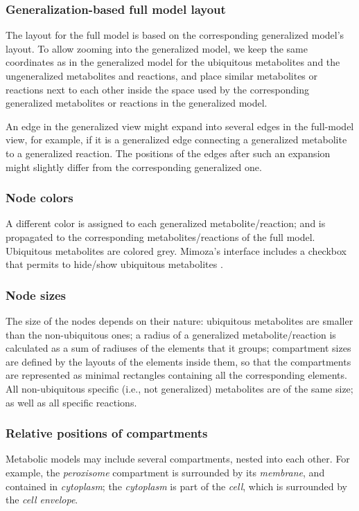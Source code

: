 \documentclass{bmcart}
\begin{document}
\subsubsection*{Generalization-based full model layout}
The layout for the full model is based on the corresponding generalized model's layout. To allow zooming into the generalized model, we keep the same coordinates as in the generalized model for the ubiquitous metabolites and the ungeneralized metabolites and reactions, and place similar metabolites or reactions next to each other inside the space used by the corresponding generalized metabolites or reactions in the generalized model. 

An edge in the generalized view might expand into several edges in the full-model view, for example, if it is a generalized edge connecting a generalized metabolite to a generalized reaction. The positions of the edges after such an expansion might slightly differ from the corresponding generalized one.

\subsubsection*{Node colors}

A different color is assigned to each generalized metabolite/reaction; and is propagated to the corresponding metabolites/reactions of the full model. Ubiquitous metabolites are colored grey. Mimoza's interface includes a checkbox that permits to hide/show ubiquitous metabolites .

\subsubsection*{Node sizes}

The size of the nodes depends on their nature: ubiquitous metabolites are smaller than the non-ubiquitous ones; a radius of a generalized metabolite/reaction is calculated as a sum of radiuses of the elements that it groups; compartment sizes are defined by the layouts of the elements inside them, so that the compartments are represented as minimal rectangles containing all the corresponding elements. All non-ubiquitous specific (i.e., not generalized) metabolites are of the same size; as well as all specific reactions.

\subsubsection*{Relative positions of compartments}
Metabolic models may include several compartments, nested into each other. For example, the \emph{peroxisome} compartment is surrounded by its \emph{membrane}, and contained in \emph{cytoplasm}; the \emph{cytoplasm} is part of the \emph{cell}, which is surrounded by the \emph{cell envelope}.
\end{document}
